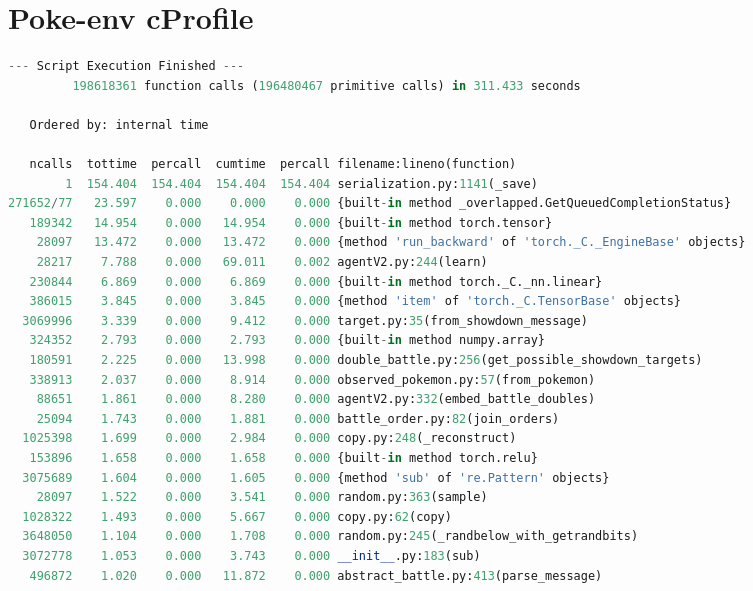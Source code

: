 \section{Poke-env cProfile}
\label{appendix:poke-env-cprofile}

\begin{changemargin}{-2cm}{-2cm}



\begin{lstlisting}[basicstyle=\fontsize{8}{8}\selectfont\ttfamily,language=Python,caption={Excerpt of Poke-env implementation cProfile sorted by time.}]
--- Script Execution Finished ---
         198618361 function calls (196480467 primitive calls) in 311.433 seconds

   Ordered by: internal time

   ncalls  tottime  percall  cumtime  percall filename:lineno(function)
        1  154.404  154.404  154.404  154.404 serialization.py:1141(_save)
271652/77   23.597    0.000    0.000    0.000 {built-in method _overlapped.GetQueuedCompletionStatus}
   189342   14.954    0.000   14.954    0.000 {built-in method torch.tensor}
    28097   13.472    0.000   13.472    0.000 {method 'run_backward' of 'torch._C._EngineBase' objects}
    28217    7.788    0.000   69.011    0.002 agentV2.py:244(learn)
   230844    6.869    0.000    6.869    0.000 {built-in method torch._C._nn.linear}
   386015    3.845    0.000    3.845    0.000 {method 'item' of 'torch._C.TensorBase' objects}
  3069996    3.339    0.000    9.412    0.000 target.py:35(from_showdown_message)
   324352    2.793    0.000    2.793    0.000 {built-in method numpy.array}
   180591    2.225    0.000   13.998    0.000 double_battle.py:256(get_possible_showdown_targets)
   338913    2.037    0.000    8.914    0.000 observed_pokemon.py:57(from_pokemon)
    88651    1.861    0.000    8.280    0.000 agentV2.py:332(embed_battle_doubles)
    25094    1.743    0.000    1.881    0.000 battle_order.py:82(join_orders)
  1025398    1.699    0.000    2.984    0.000 copy.py:248(_reconstruct)
   153896    1.658    0.000    1.658    0.000 {built-in method torch.relu}
  3075689    1.604    0.000    1.605    0.000 {method 'sub' of 're.Pattern' objects}
    28097    1.522    0.000    3.541    0.000 random.py:363(sample)
  1028322    1.493    0.000    5.667    0.000 copy.py:62(copy)
  3648050    1.104    0.000    1.708    0.000 random.py:245(_randbelow_with_getrandbits)
  3072778    1.053    0.000    3.743    0.000 __init__.py:183(sub)
   496872    1.020    0.000   11.872    0.000 abstract_battle.py:413(parse_message)

\end{lstlisting}
\end{changemargin}

